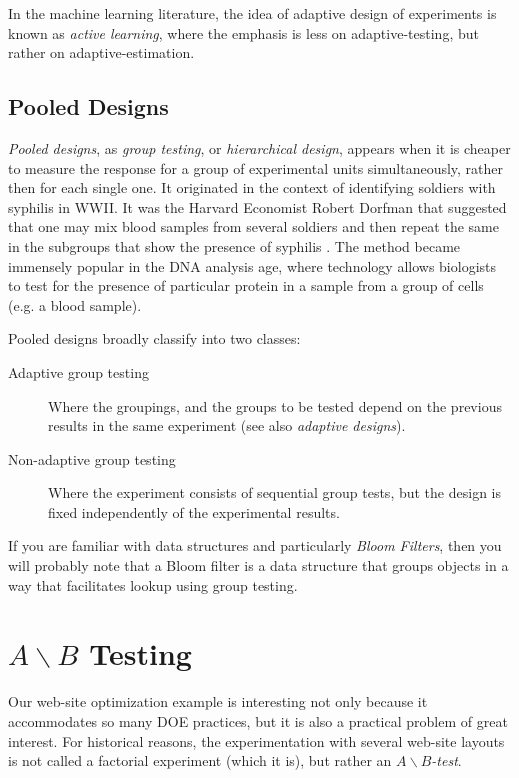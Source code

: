 \begin{extra}
In the machine learning literature, the idea of adaptive design of experiments is known as \emph{active learning}, where the emphasis is less on adaptive-testing, but rather on adaptive-estimation.
\end{extra}




\subsection{Pooled Designs}
\emph{Pooled designs}, \aka as \emph{group testing}, or \emph{hierarchical design}, appears when it is cheaper to measure the response for a group of experimental units simultaneously, rather then for each single one. 
It originated in the context of identifying soldiers with syphilis in WWII. It was the Harvard Economist Robert Dorfman that suggested that one may mix blood samples from several soldiers and then repeat the same in the subgroups that show the presence of syphilis \citep{dorfman_detection_1943}. 
The method became immensely popular in the DNA analysis age, where technology allows biologists to test for the presence of particular protein in a sample from a group of cells (e.g. a blood sample). 

Pooled designs broadly classify into two classes: 
\begin{description}
\item [Adaptive group testing] Where the groupings, and the groups to be tested depend on the previous results in the same experiment (see also \emph{adaptive designs}).
\item [Non-adaptive group testing] Where the experiment consists of sequential group tests, but the design is fixed independently of the experimental results. 
\end{description}


\begin{extra}
If you are familiar with data structures and particularly \emph{Bloom Filters}, then you will probably note that a Bloom filter is a data structure that groups objects in a way that facilitates lookup using group testing. 
\end{extra}



\section[AB testing]{$A\backslash B$ Testing}
Our web-site optimization example is interesting not only because it accommodates so many DOE practices, but it is also a practical problem of great interest.
For historical reasons, the experimentation with several web-site layouts is not called a factorial experiment (which it is), but rather an \emph{$A\backslash B$-test}.

